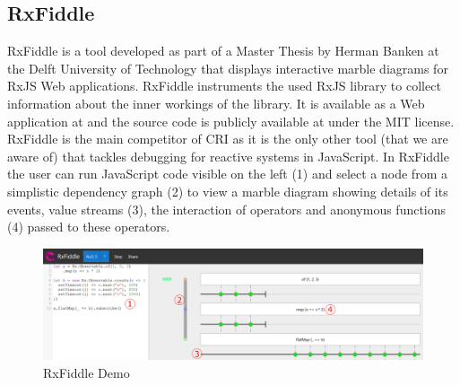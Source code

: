 	\subsection{RxFiddle}
	\label{sec:RxFiddle} %
	RxFiddle \cite{RxFiddle} is a tool developed as part of a Master Thesis by Herman Banken at the Delft University of Technology that displays interactive marble diagrams for RxJS Web applications. RxFiddle instruments the used RxJS library to collect information about the inner workings of the library. It is available as a Web application at \cite{RxFiddle} and the source code is publicly available at \cite{RxFiddleGitHub} under the MIT license. RxFiddle is the main competitor of CRI as it is the only other tool (that we are aware of) that tackles debugging for reactive systems in JavaScript. In RxFiddle the user can run JavaScript code visible on the left (1) and select a node from a simplistic dependency graph (2) to view a marble diagram showing details of its events, value streams (3), the interaction of operators and anonymous functions (4) passed to these operators.
	
	\begin{figure}[!h]
		\centering
		\includegraphics[scale=0.5,trim=0 0 0 0]{gfx/RxFiddleDemo.png}
		\caption{RxFiddle Demo \protect\cite{RxFiddle}}
		\label{fig:RxFiddleDemo}
	\end{figure}

